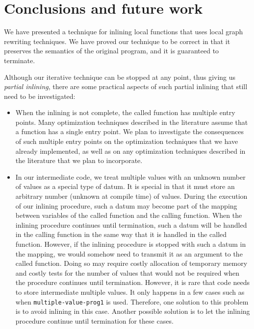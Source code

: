 \section{Conclusions and future work}
\label{sec-conclusions}

We have presented a technique for inlining local functions that uses
local graph rewriting techniques.  We have proved our technique to be
correct in that it preserves the semantics of the original program,
and it is guaranteed to terminate.

Although our iterative technique can be stopped at any point, thus
giving us \emph{partial inlining}, there are some practical aspects of
such partial inlining that still need to be investigated:

\begin{itemize}
\item When the inlining is not complete, the called function has
  multiple entry points.  Many optimization techniques described in
  the literature assume that a function has a single entry point.  We
  plan to investigate the consequences of such multiple entry points
  on the optimization techniques that we have already implemented, as
  well as on any optimization techniques described in the literature
  that we plan to incorporate.
\item In our intermediate code, we treat multiple values with an
  unknown number of values as a special type of datum.  It is special
  in that it must store an arbitrary number (unknown at compile time)
  of values.  During the execution of our inlining procedure, such a
  datum may become part of the mapping between variables of the called
  function and the calling function.  When the inlining procedure
  continues until termination, such a datum will be handled in the
  calling function in the same way that it is handled in the called
  function.  However, if the inlining procedure is stopped with such a
  datum in the mapping, we would somehow need to transmit it as an
  argument to the called function.  Doing so may require costly
  allocation of temporary memory and costly tests for the number of
  values that would not be required when the procedure continues until
  termination.  However, it is rare that code needs to store
  intermediate multiple values.  It only happens in a few cases such
  as when \texttt{multiple-value-prog1} is used.  Therefore, one
  solution to this problem is to avoid inlining in this case.  Another
  possible solution is to let the inlining procedure continue until
  termination for these cases.
\end{itemize}
